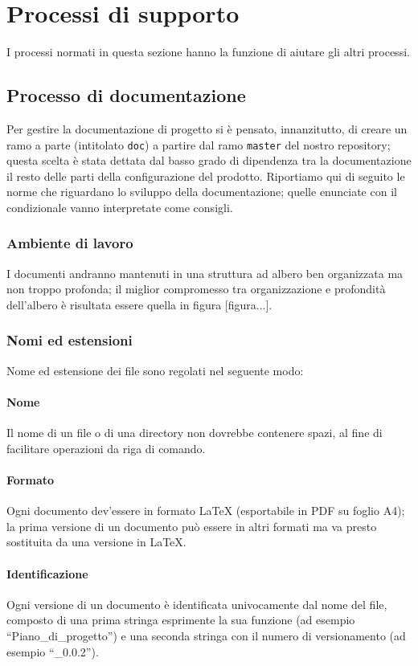 \section{Processi di supporto}
I processi normati in questa sezione hanno la funzione di aiutare gli altri processi.

\subsection{Processo di documentazione}
Per gestire la documentazione di progetto si è pensato, innanzitutto, di creare un ramo a parte (intitolato \texttt{doc}) a partire dal ramo \texttt{master} del nostro repository; questa scelta è stata dettata dal basso grado di dipendenza tra la documentazione il resto delle parti della configurazione del prodotto. Riportiamo qui di seguito le norme che riguardano lo sviluppo della documentazione; quelle enunciate con il condizionale vanno interpretate come consigli.

\subsubsection{Ambiente di lavoro} I documenti andranno mantenuti in una struttura ad albero ben organizzata ma non troppo profonda; il miglior compromesso tra organizzazione e profondità dell'albero è risultata essere quella in figura [figura...].

\subsubsection{Nomi ed estensioni} Nome ed estensione dei file sono regolati nel seguente modo:
\paragraph{Nome} Il nome di un file o di una directory non dovrebbe contenere spazi, al fine di facilitare operazioni da riga di comando.
\paragraph{Formato} Ogni documento dev'essere in formato \LaTeX{} (esportabile in PDF su foglio A4); la prima versione di un documento può essere in altri formati ma va presto sostituita da una versione in \LaTeX.
\paragraph{Identificazione} Ogni versione di un documento è identificata univocamente dal nome del file, composto di una prima stringa esprimente la sua funzione (ad esempio “Piano\_di\_progetto”) e una seconda stringa con il numero di versionamento (ad esempio “\_0.0.2”).
